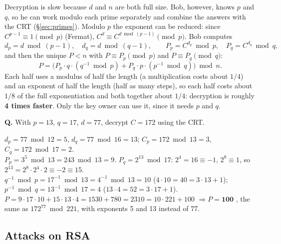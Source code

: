Decryption is slow because $d$ and $n$ are both full size. Bob, however, knows $p$ and $q$, so he can work modulo each prime separately and combine the answers with the CRT (\S\ref{sec:primes}). Modulo $p$ the exponent can be reduced: since $C^{p-1} \equiv 1 \pmod p$ (Fermat), $C^d \equiv C^{d \bmod (p-1)} \pmod p$. Bob computes
\[
d_p = d \bmod (p-1),\quad d_q = d \bmod (q-1),\qquad P_p = C^{d_p} \bmod p,\quad P_q = C^{d_q} \bmod q,
\]
and then the unique $P < n$ with $P \equiv P_p \pmod p$ and $P \equiv P_q \pmod q$:
\[
P = \big(P_p \cdot q \cdot (q^{-1} \bmod p) + P_q \cdot p \cdot (p^{-1} \bmod q)\big) \bmod n .
\]
Each half uses a modulus of half the length (a multiplication costs about $1/4$) and an exponent of half the length (half as many steps), so each half costs about $1/8$ of the full exponentiation and both together about $1/4$: decryption is roughly \textbf{4 times faster}. Only the key owner can use it, since it needs $p$ and $q$.

\begin{worked}
\textbf{Q.} With $p = 13$, $q = 17$, $d = 77$, decrypt $C = 172$ using the CRT.

$d_p = 77 \bmod 12 = 5$, \;$d_q = 77 \bmod 16 = 13$; \;$C_p = 172 \bmod 13 = 3$, \;$C_q = 172 \bmod 17 = 2$.\\
$P_p = 3^5 \bmod 13 = 243 \bmod 13 = 9$. \;$P_q = 2^{13} \bmod 17$: $2^4 = 16 \equiv -1$, $2^8 \equiv 1$, so $2^{13} = 2^8 \cdot 2^4 \cdot 2 \equiv -2 \equiv 15$.\\
$q^{-1} \bmod p = 17^{-1} \bmod 13 = 4^{-1} \bmod 13 = 10$ \;($4 \cdot 10 = 40 = 3 \cdot 13 + 1$); \;$p^{-1} \bmod q = 13^{-1} \bmod 17 = 4$ \;($13 \cdot 4 = 52 = 3 \cdot 17 + 1$).\\
$P = 9 \cdot 17 \cdot 10 + 15 \cdot 13 \cdot 4 = 1530 + 780 = 2310 = 10 \cdot 221 + 100$ $\Rightarrow P = \mathbf{100}$ \checkmark, the same as $172^{77} \bmod 221$, with exponents 5 and 13 instead of 77.
\end{worked}

\subsection{Attacks on RSA \new}

